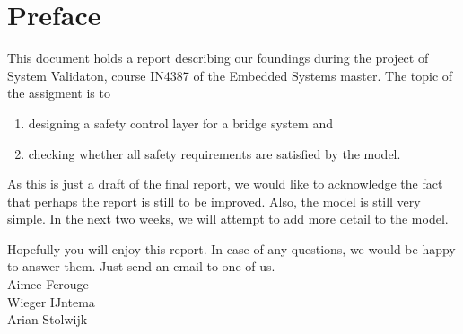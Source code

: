 \newpage
\section*{Preface}

This document holds a report describing our foundings during the project of System Validaton, course IN4387 of the Embedded Systems master.
The topic of the assigment is to
%
\begin{enumerate}
	\item designing a safety control layer for a bridge system and
	\item checking whether all safety requirements are satisfied by the model.
\end{enumerate}
%
As this is just a draft of the final report, we would like to acknowledge the fact that perhaps the report is still to be improved. Also, the model is still very simple. In the next two weeks, we will attempt to add more detail to the model.

Hopefully you will enjoy this report. In case of any questions, we would be happy to answer them. Just send an email to one of us.\\
\vspace{+50pt}
Aimee Ferouge\\
Wieger IJntema\\
Arian Stolwijk


\newpage